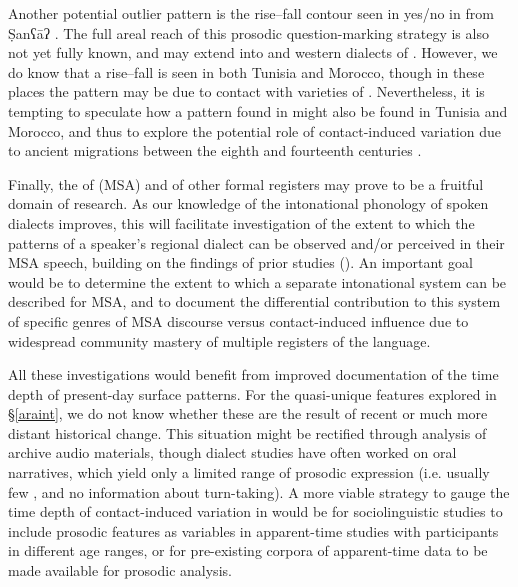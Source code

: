 \documentclass[output=paper]{langsci/langscibook}
\begin{document}
Another potential outlier pattern is the rise--fall  contour seen in yes/no  in   from Ṣanʕāʔ \citep{Hellmuth2014}. The full areal reach of this prosodic question-marking strategy is also not yet fully known, and may extend into   and western dialects of . However, we do know that a rise--fall is seen in both Tunisia and Morocco, though in these places the pattern may be due to contact with varieties of  . Nevertheless, it is tempting to speculate how a pattern found in  might also be found in Tunisia and Morocco, and thus to explore the potential role of contact-induced variation due to ancient migrations between the eighth and fourteenth centuries \citep{Holes2018}.

Finally, the  of   (MSA) and of other formal registers may prove to be a fruitful domain of  research. As our knowledge of the intonational phonology of spoken  dialects improves, this will facilitate investigation of the extent to which the  patterns of a speaker’s regional dialect can be observed and/or perceived in their MSA speech, building on the findings of prior studies (\citealt{ElZarkaHellmuth2009}). An important goal would be to determine the extent to which a separate intonational system can be described for MSA, and to document the differential contribution to this system of specific genres of MSA discourse versus contact-induced influence due to widespread community mastery of multiple registers of the language.  

All these investigations would benefit from improved documentation of the time depth of present-day surface  patterns. For the quasi-unique features explored in §\ref{araint}, we do not know whether these are the result of recent or much more distant historical change. This situation might be rectified through analysis of archive audio materials, though dialect studies have often worked on oral narratives, which yield only a limited range of prosodic expression (i.e. usually few , and no information about turn-taking). A more viable strategy to gauge the time depth of contact-induced variation in   would be for  sociolinguistic studies to include prosodic features as variables in apparent-time studies with participants in different age ranges, or for pre-existing corpora of apparent-time data to be made available for prosodic analysis.
\end{document}

